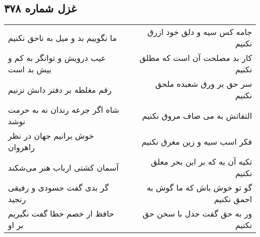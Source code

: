 \begin{center}
\section*{غزل شماره ۳۷۸}
\label{sec:sh378}
\begin{longtable}{l p{0.5cm} r}
ما نگوییم بد و میل به ناحق نکنیم
&&
جامه کس سیه و دلق خود ازرق نکنیم
\\
عیب درویش و توانگر به کم و بیش بد است
&&
کار بد مصلحت آن است که مطلق نکنیم
\\
رقم مغلطه بر دفتر دانش نزنیم
&&
سر حق بر ورق شعبده ملحق نکنیم
\\
شاه اگر جرعه رندان نه به حرمت نوشد
&&
التفاتش به می صاف مروق نکنیم
\\
خوش برانیم جهان در نظر راهروان
&&
فکر اسب سیه و زین مغرق نکنیم
\\
آسمان کشتی ارباب هنر می‌شکند
&&
تکیه آن به که بر این بحر معلق نکنیم
\\
گر بدی گفت حسودی و رفیقی رنجید
&&
گو تو خوش باش که ما گوش به احمق نکنیم
\\
حافظ ار خصم خطا گفت نگیریم بر او
&&
ور به حق گفت جدل با سخن حق نکنیم
\\
\end{longtable}
\end{center}

